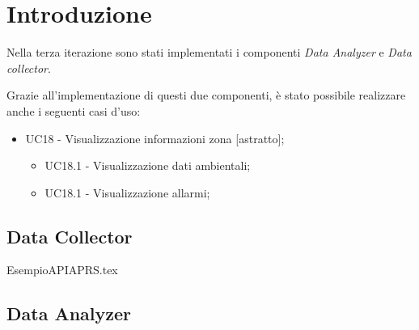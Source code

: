 \section{Introduzione}
Nella terza iterazione sono stati implementati i componenti \textit{Data Analyzer} e \textit{Data collector}. 

Grazie all'implementazione di questi due componenti, è stato possibile realizzare anche i seguenti casi d'uso:
\begin{itemize}
	\item UC18 - Visualizzazione informazioni zona [astratto];
	\begin{itemize}
		\item UC18.1 - Visualizzazione dati ambientali;
		\item UC18.1 - Visualizzazione allarmi;
	\end{itemize}
\end{itemize}


\subsection{Data Collector}

{EsempioAPIAPRS.tex}


\subsection{Data Analyzer}

